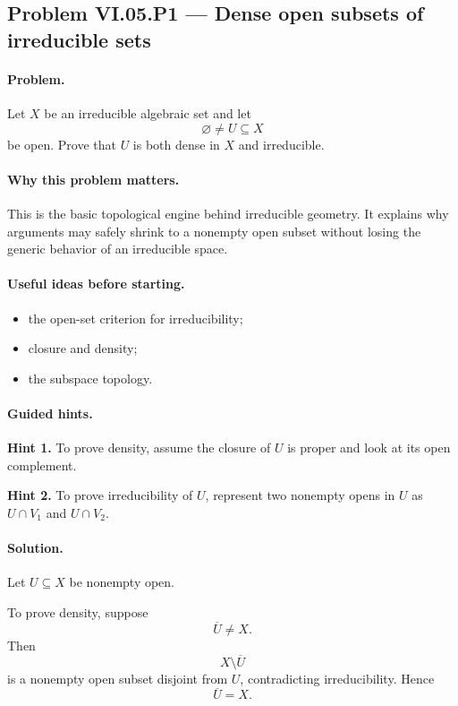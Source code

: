 \subsection*{Problem VI.05.P1 --- Dense open subsets of irreducible sets}
\label{prob:vi-05-p1}

\paragraph{Problem.}
\label{prob:vi05-p1}
Let \(X\) be an irreducible algebraic set and let
\[
\varnothing\neq U\subseteq X
\]
be open.  Prove that \(U\) is both dense in \(X\) and irreducible.

\ifdefined\FullProblemDossiers

\paragraph{Why this problem matters.}
This is the basic topological engine behind irreducible geometry.  It explains why
arguments may safely shrink to a nonempty open subset without losing the generic behavior
of an irreducible space.

\paragraph{Useful ideas before starting.}
\begin{itemize}
\item the open-set criterion for irreducibility;
\item closure and density;
\item the subspace topology.
\end{itemize}

\paragraph{Guided hints.}
\textbf{Hint 1.} To prove density, assume the closure of \(U\) is proper and look at
its open complement.

\textbf{Hint 2.} To prove irreducibility of \(U\), represent two nonempty opens in \(U\) as
\(U\cap V_1\) and \(U\cap V_2\).

\paragraph{Solution.}
Let \(U\subseteq X\) be nonempty open.

To prove density, suppose
\[
\overline U\neq X.
\]
Then
\[
X\setminus\overline U
\]
is a nonempty open subset disjoint from \(U\), contradicting irreducibility.  Hence
\[
\overline U=X.
\]

